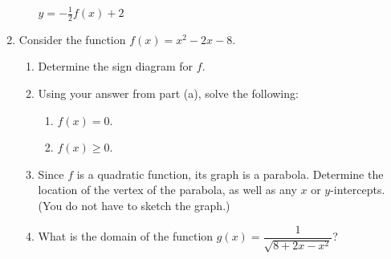 \documentclass[12pt]{article}
\newcommand{\points}[1]{\marginpar{\hspace{24pt}[#1]}}
\begin{document}
\begin{enumerate}
\begin{enumerate}
\begin{multicols}{2}
\begin{center}
$y=-\frac{1}{2}f(x)+2$
\end{center}
\end{multicols}

\end{enumerate}
\newpage

\item Consider the function $f(x) = x^2-2x-8$.
\begin{enumerate}
 \item Determine the sign diagram for $f$. \points{3}

\vspace{2in}

 \item Using your answer from part (a), solve the following:
\begin{enumerate}
 \item $f(x)=0$. \points{1}

\vspace{0.5in}

 \item $f(x)\geq 0$. \points{1}
\end{enumerate}

\vspace{0.75in}

\item Since $f$ is a quadratic function, its graph is a parabola. Determine the location of the vertex of the parabola, as well as any $x$ or $y$-intercepts. (You do not have to sketch the graph.) \points{4}

\vspace{2in}

\item What is the domain of the function $g(x) = \dfrac{1}{\sqrt{8+2x-x^2}}$? \points{1}



\end{enumerate}


\end{enumerate}
\end{document}
